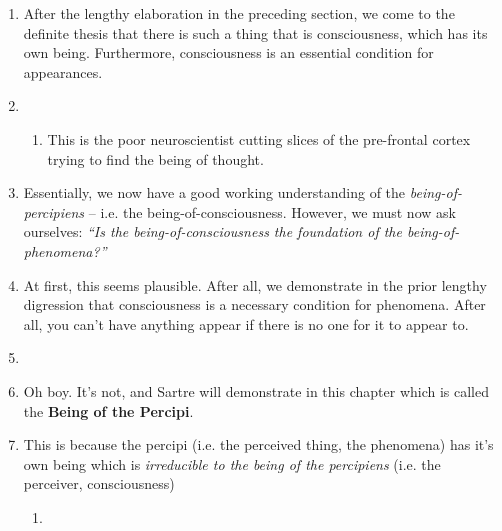 \begin{enumerate}
  \item After the lengthy elaboration in the preceding section, we come to the definite thesis that there is such a thing that is consciousness, which has its own being. Furthermore, consciousness is an essential condition for appearances.
  \item {}
  \begin{enumerate}
    \item This is the poor neuroscientist cutting slices of the pre-frontal cortex trying to find the being of thought.
  \end{enumerate}
  \item Essentially, we now have a good working understanding of the \emph{being-of-percipiens} -- i.e. the being-of-consciousness. However, we must now ask ourselves: \emph{\enquote{Is the being-of-consciousness the foundation of the being-of-phenomena?}}
  \item At first, this seems plausible. After all, we demonstrate in the prior lengthy digression that consciousness is a necessary condition for phenomena. After all, you can't have anything appear if there is no one for it to appear to.
  \item {}
  \item Oh boy. It's not, and Sartre will demonstrate in this chapter which is called the \textbf{Being of the Percipi}.
  \item This is because the percipi (i.e. the perceived thing, the phenomena) has it's own being which is \emph{irreducible to the being of the percipiens} (i.e. the perceiver, consciousness)
  \begin{enumerate}
    \item {}
  \end{enumerate}


\end{enumerate}
